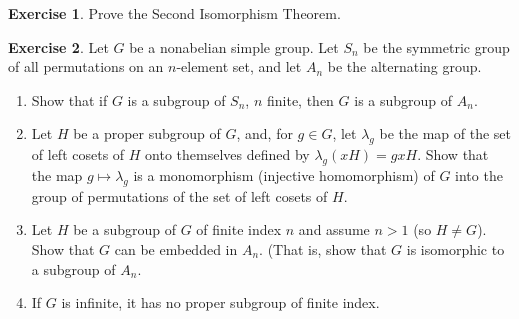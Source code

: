 \documentclass[12pt]{article}
\theoremstyle{plain}
\theoremstyle{definition}
\newtheorem{exercise}{Exercise}
\theoremstyle{remark}
\theoremstyle{remark}
\numberwithin{theorem}{section}
\numberwithin{equation}{section}
\newcommand{\<}{\ensuremath{\langle}}
\renewcommand{\>}{\ensuremath{\rangle}}
\begin{document}
  \begin{exercise}
    Prove the Second Isomorphism Theorem.
  \end{exercise}

  \begin{exercise}
    Let $G$ be a nonabelian simple group.  Let $S_n$ be the symmetric group of all
  permutations on an $n$-element set, and let $A_n$ be the alternating group.
    \begin{enumerate}
    \item 
      Show that if $G$ is a subgroup of $S_n$, $n$ finite, then $G$ is a subgroup
      of $A_n$.
    \item Let $H$ be a proper subgroup of $G$, and, for $g\in G$, let $\lambda_g$ be
      the map of the set of left cosets of $H$ onto themselves defined by
      $\lambda_g(xH) = gxH$.  
      Show that the map $g\mapsto \lambda_g$ is a monomorphism (injective
      homomorphism) of $G$ into the group of permutations of the set of left
      cosets of $H$. 
    \item Let $H$ be a subgroup of $G$ of finite index $n$  and assume $n>1$ (so $H \neq G$).  
      Show that $G$ can be embedded in $A_n$. (That is, show that $G$ is
      isomorphic to a subgroup of $A_n$.
    \item If $G$ is infinite, it has no proper subgroup of finite index.
    \end{enumerate}
  \end{exercise}
\end{document}
